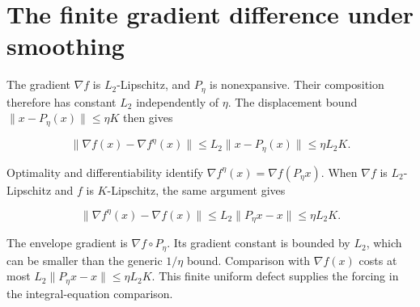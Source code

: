 \documentclass[11pt,a4paper]{article}
\begin{document}
\section{\texorpdfstring{The finite gradient difference under smoothing}{The finite gradient difference under smoothing}}


The gradient \(\nabla f\) is \(L_2\)-Lipschitz, and \(P_\eta\) is nonexpansive. Their composition therefore has constant \(L_2\) independently of \(\eta\). The displacement bound \(\|x-P_\eta(x)\|\le\eta K\) then gives

\[\|\nabla f(x)-\nabla f^\eta(x)\|\le L_2\|x-P_\eta(x)\|\le\eta L_2K.\]

Optimality and differentiability identify \(\nabla f^\eta(x)=\nabla f(P_\eta x)\). When \(\nabla f\) is \(L_2\)-Lipschitz and \(f\) is \(K\)-Lipschitz, the same argument gives

\[\|\nabla f^\eta(x)-\nabla f(x)\|\le L_2\|P_\eta x-x\|\le\eta L_2K.\]

The envelope gradient is \(\nabla f\circ P_\eta\). Its gradient constant is bounded by \(L_2\), which can be smaller than the generic \(1/\eta\) bound. Comparison with \(\nabla f(x)\) costs at most \(L_2\|P_\eta x-x\|\le\eta L_2K\). This finite uniform defect supplies the forcing in the integral-equation comparison.
\end{document}
